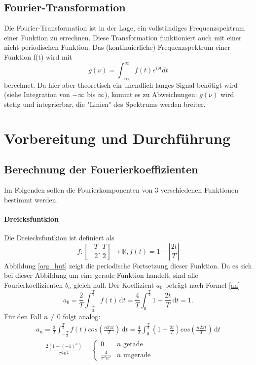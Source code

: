 \documentclass[11pt,ngerman,a4paper]{article}
\begin{document}
\subsection{Fourier-Transformation}
Die Fourier-Transformation ist in der Lage, ein vollständiges Frequenzspektrum einer Funktion zu errechnen. Diese Transformation funktioniert auch mit einer nicht periodischen Funktion. Das (kontinuierliche) Frequenzspektrum einer Funktion f(t) wird mit
\begin{equation}
g(\nu)=\int_{-\infty}^\infty f(t)e^{i\nu t}dt
\label{trafo}
\end{equation}
berechnet. Da hier aber theoretisch ein unendlich langes Signal benötigt wird (siehe Integration von $-\infty$ bis $\infty$), kommt es zu Abweichungen: $g(\nu)$ wird stetig und integrierbar, die "Linien" des Spektrums werden breiter.

\section{Vorbereitung und Durchf\"{u}hrung}
\subsection{Berechnung der Fouerierkoeffizienten}
Im Folgenden sollen die Fourierkomponenten von 3 verschiedenen Funktionen bestimmt werden. 
\paragraph{Dreicksfuntkion}
Die Dreiecksfuntkion ist definiert als
\begin{equation}
f \colon  \left[-\frac{T}{2}, \frac{T}{2}\right]\to \mathbb{R}, f(t) = 1 - \left|\frac{2t}{T}\right|
\end{equation}
Abbildung \ref{org_hut} zeigt die periodische Fortsetzung dieser Funktion. Da es sich bei dieser Abbildung um eine gerade Funktion handelt, sind alle Fourierkoeffizienten $b_n$ gleich null. Der Koeffizient $a_0$ betr\"agt nach Formel \ref{an}
\begin{equation} 
a_0 =\frac{2}{T} \int_{-\frac{T}{2}}^{\frac{T}2}\!f(t)\,\mathrm dt= \frac4T \int_{0}^{\frac{T}2}\!1-\frac{2t}{T}\,\mathrm dt= 1.
\end{equation}
F\"ur den Fall $n \neq 0$ folgt analog:
\begin{align}
a_n =\frac{2}{T} \int_{-\frac{T}{2}}^{\frac{T}2}\!f(t)cos\left(\frac{n2\pi t}{T}\right) \,\mathrm dt = \frac{4}{T} \int_0^\frac{T}2\!\left(1-\frac{2t}{T}\right)cos\left(\frac{n2\pi t}{T}\right)\,\mathrm dt \\= \frac{2 (1-(-1)^n)}{\pi^2n^2} = \begin{cases}
0 & n\mbox{ gerade} \\ \frac{4}{\pi^2n^2} & n\mbox{ ungerade}
\end{cases}
\end{align} 
\end{document}
